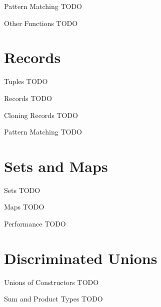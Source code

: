 \documentclass{beamer}
\begin{document}
\begin{frame}{Pattern Matching}
  TODO
\end{frame}

\begin{frame}{Other Functions}
  TODO
\end{frame}

\section{Records}
\frame{\tableofcontents[currentsection]}

\begin{frame}[label=tuples]{Tuples}
  TODO
\end{frame}

\begin{frame}{Records}
  TODO
\end{frame}

\begin{frame}{Cloning Records}
  TODO
\end{frame}

\begin{frame}{Pattern Matching}
  TODO
\end{frame}

\section{Sets and Maps}
\frame{\tableofcontents[currentsection]}

\begin{frame}{Sets}
  TODO
\end{frame}

\begin{frame}{Maps}
  TODO
\end{frame}

\begin{frame}{Performance}
  TODO
\end{frame}

\section{Discriminated Unions}
\frame{\tableofcontents[currentsection]}


\begin{frame}{Unions of Constructors}
  TODO
\end{frame}

\begin{frame}{Sum and Product Types}
  TODO
\end{frame}
\end{document}
